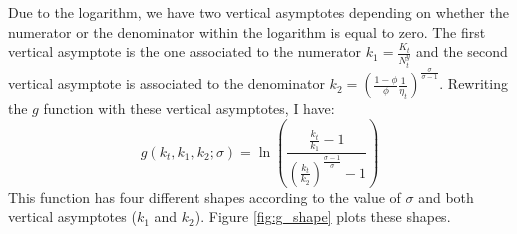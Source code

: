 Due to the logarithm, we have two vertical asymptotes depending on whether the numerator or the denominator within the logarithm is equal to zero. The first vertical asymptote is the one associated to the numerator $k_1 = \frac{K_t}{N_t^y}$ and the second vertical asymptote is associated to the denominator $k_2 = \left(\frac{1-\phi}{\phi} \frac{1}{\eta_t}\right)^{\frac{\sigma}{\sigma-1}}$. Rewriting the $g$ function with these vertical asymptotes, I have:
	\begin{equation*}
		g(k_t, k_1, k_2; \sigma) = \ln\left( \frac{\frac{k_t}{k_1}-1}{\left(\frac{k_t}{k_2}\right)^{\frac{\sigma - 1}{\sigma}} - 1} \right)
	\end{equation*}
This function has four different shapes according to the value of $\sigma$ and both vertical asymptotes ($k_1$ and $k_2$). Figure \ref{fig:g_shape} plots these shapes.
